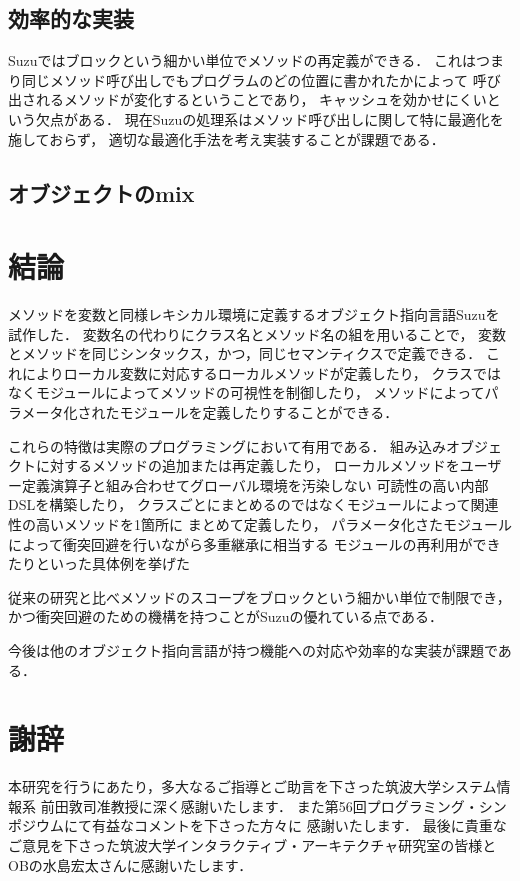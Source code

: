 \documentclass[a4paper,11pt,dvipdfmx]{jreport}
\begin{document}
\section{効率的な実装}

Suzuではブロックという細かい単位でメソッドの再定義ができる．
これはつまり同じメソッド呼び出しでもプログラムのどの位置に書かれたかによって
呼び出されるメソッドが変化するということであり，
キャッシュを効かせにくいという欠点がある．
現在Suzuの処理系はメソッド呼び出しに関して特に最適化を施しておらず，
適切な最適化手法を考え実装することが課題である．

\section{オブジェクトのmix}

\chapter{結論}
\label{chapter:conclusion}

メソッドを変数と同様レキシカル環境に定義するオブジェクト指向言語Suzuを試作した．
変数名の代わりにクラス名とメソッド名の組を用いることで，
変数とメソッドを同じシンタックス，かつ，同じセマンティクスで定義できる．
これによりローカル変数に対応するローカルメソッドが定義したり，
クラスではなくモジュールによってメソッドの可視性を制御したり，
メソッドによってパラメータ化されたモジュールを定義したりすることができる．

これらの特徴は実際のプログラミングにおいて有用である．
組み込みオブジェクトに対するメソッドの追加または再定義したり，
ローカルメソッドをユーザー定義演算子と組み合わせてグローバル環境を汚染しない
可読性の高い内部DSLを構築したり，
クラスごとにまとめるのではなくモジュールによって関連性の高いメソッドを1箇所に
まとめて定義したり，
パラメータ化さたモジュールによって衝突回避を行いながら多重継承に相当する
モジュールの再利用ができたりといった具体例を挙げた

従来の研究と比べメソッドのスコープをブロックという細かい単位で制限でき，
かつ衝突回避のための機構を持つことがSuzuの優れている点である．

今後は他のオブジェクト指向言語が持つ機能への対応や効率的な実装が課題である．


\chapter*{謝辞}

本研究を行うにあたり，多大なるご指導とご助言を下さった筑波大学システム情報系
前田敦司准教授に深く感謝いたします．
また第56回プログラミング・シンポジウムにて有益なコメントを下さった方々に
感謝いたします．
最後に貴重なご意見を下さった筑波大学インタラクティブ・アーキテクチャ研究室の皆様と
OBの水島宏太さんに感謝いたします．
\end{document}
